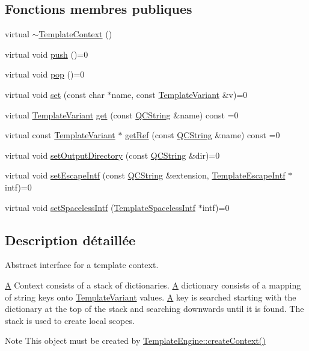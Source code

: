 \subsection*{Fonctions membres publiques}
\begin{DoxyCompactItemize}
\item 
virtual \hyperlink{class_template_context_a58a25dce8e534452fe1c31ab0657d094}{$\sim$\+Template\+Context} ()
\item 
virtual void \hyperlink{class_template_context_aac3a3e3c8e604db05e74cba7b1ce8554}{push} ()=0
\item 
virtual void \hyperlink{class_template_context_a853868792ccd7f9c5fed55338d23d019}{pop} ()=0
\item 
virtual void \hyperlink{class_template_context_a99d037bab858efc4fa8602fae3a5af9c}{set} (const char $\ast$name, const \hyperlink{class_template_variant}{Template\+Variant} \&v)=0
\item 
virtual \hyperlink{class_template_variant}{Template\+Variant} \hyperlink{class_template_context_ac71db7b45ea80f9f2e37b29373bb0b8c}{get} (const \hyperlink{class_q_c_string}{Q\+C\+String} \&name) const  =0
\item 
virtual const \hyperlink{class_template_variant}{Template\+Variant} $\ast$ \hyperlink{class_template_context_aa53297dffcc3e712ed7fd2454340efb6}{get\+Ref} (const \hyperlink{class_q_c_string}{Q\+C\+String} \&name) const  =0
\item 
virtual void \hyperlink{class_template_context_ab3aaaa03df934615ccfa3209420cd93d}{set\+Output\+Directory} (const \hyperlink{class_q_c_string}{Q\+C\+String} \&dir)=0
\item 
virtual void \hyperlink{class_template_context_afad803f8d522fb63ad4b91a2034b06a0}{set\+Escape\+Intf} (const \hyperlink{class_q_c_string}{Q\+C\+String} \&extension, \hyperlink{class_template_escape_intf}{Template\+Escape\+Intf} $\ast$intf)=0
\item 
virtual void \hyperlink{class_template_context_a11e64f588d21aeda2b57a4bc4e06ecc7}{set\+Spaceless\+Intf} (\hyperlink{class_template_spaceless_intf}{Template\+Spaceless\+Intf} $\ast$intf)=0
\end{DoxyCompactItemize}


\subsection{Description détaillée}
Abstract interface for a template context. 

\hyperlink{class_a}{A} Context consists of a stack of dictionaries. \hyperlink{class_a}{A} dictionary consists of a mapping of string keys onto \hyperlink{class_template_variant}{Template\+Variant} values. \hyperlink{class_a}{A} key is searched starting with the dictionary at the top of the stack and searching downwards until it is found. The stack is used to create local scopes. \begin{DoxyNote}{Note}
This object must be created by \hyperlink{class_template_engine_a2863516c0e38758c45a6ee0de151c740}{Template\+Engine\+::create\+Context()} 
\end{DoxyNote}


